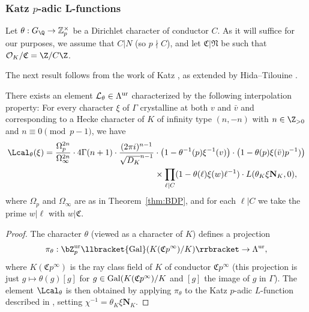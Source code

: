 \subsubsection{Katz $p$-adic L-functions}

Let $\theta:G_\Q\rightarrow\mathbb{Z}_p^\times$ be a Dirichlet character of conductor $C$. As it will suffice for our purposes, we assume that $C\vert N$ (so $p\nmid C$), and let $\mathfrak{C}\vert\mathfrak{N}$ be such that $\mathcal{O}_K/\mathfrak{C}=\Z/C\Z$.

The next result follows from the work of Katz \cite{katz}, as extended by Hida--Tilouine \cite{hidatilouineI}.

\begin{theorem}
\notready\label{thm:Katz}
There exists an element $\mathcal{L}_{\theta}\in\Lambda^{\rm ur}$ characterized by the following interpolation property: For every character $\xi$ of $\Gamma$ crystalline at both $v$ and $\bar{v}$ and corresponding to a Hecke character of $K$ of infinity type $(n,-n)$ with $n\in\Z_{>0}$ and $n\equiv 0\pmod{p-1}$, we have
\begin{align*}
\Lcal_{\theta}(\xi)=\frac{\Omega_p^{2n}}{\Omega_\infty^{2n}}\cdot 4\Gamma(n+1)\cdot\frac{(2\pi i)^{n-1}}{\sqrt{D_K}^{n-1}}&\cdot\bigl(1-\theta^{-1}(p)\xi^{-1}(v)\bigr)\cdot\bigl(1-\theta(p)\xi(\bar{v})p^{-1})\bigr)\\
&\times\prod_{\ell\vert C}(1-\theta(\ell)\xi(w)\ell^{-1})\cdot L(\theta_{K}\xi\mathbf{N}_K,0),
\end{align*}
where $\Omega_p$ and $\Omega_\infty$ are as in Theorem~\ref{thm:BDP}, and for each $\ell\vert C$ we take the prime $w\vert\ell$ with $w\vert\mathfrak{C}$.
\end{theorem}

\begin{proof}
The character $\theta$  (viewed as a character of $K$) defines a projection
\[
\pi_\theta:\bZ_p^{\rm ur}\llbracket{\rm Gal}(K(\mathfrak{C}p^\infty)/K)\rrbracket\rightarrow\Lambda^{\rm ur},
\]
where $K(\mathfrak{C}p^\infty)$ is the ray class field of $K$ of conductor $\mathfrak{C}p^\infty$
(this projection is just $g\mapsto \theta(g)[g]$ for $g\in {\rm Gal}(K(\mathfrak{C}p^\infty)/K$
and $[g]$ the image of $g$ in $\Gamma$).
The element $\Lcal_{\theta}$ is then obtained by applying $\pi_\theta$ to the Katz $p$-adic $L$-function described in \cite[Thm.~27]{kriz}, setting $\chi^{-1}=\theta_K\xi\mathbf{N}_K$.
\end{proof}


